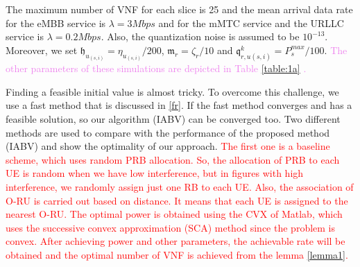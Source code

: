 \documentclass[lettersize,journal]{IEEEtran}
\begin{document}
The maximum number of VNF for each slice is 25 and the mean arrival data rate for the eMBB service is $\lambda  = 3Mbps$ and for the mMTC service and the URLLC  service is $\lambda  = 0.2Mbps$. 
Also, the quantization noise is assumed to be $10^{-13}$.
Moreover, we set $\mathfrak{h}_{u_{(s,i)}} = \eta_{u_{(s,i)}}/200$, $\mathfrak{m}_{r} = \zeta_r/10$
and $\mathfrak{q}^k_{r,u(s,i)} = P_{s}^{max}/100$. \textcolor{Violet}{The other parameters of these simulations are depicted in Table \ref{table:1a} \cite{3GPPTS1, 3GPPTS2, 3GPPTS3, IMT, ETSI1}.}
\begin{table}[H]
 \caption {Simulation Parameters} \label{table:1a}
 \begin{center}
 \end{center}
 \end{table} 
Finding a feasible initial value is almost tricky. To overcome this challenge, we use a fast method that is discussed in \ref{fr}. If the fast method converges and has a feasible solution, so our algorithm (IABV) can be converged too.
Two different methods are used to compare with the performance of the proposed method (IABV) and show the optimality of our approach.
\textcolor{red}{ The first one is a baseline scheme, which uses random PRB allocation. 
So, the allocation of PRB  to each UE is random when we have low interference, but in figures with high interference, we randomly assign just one RB to each UE. Also, the association of O-RU is carried out based on distance. It means that each UE is assigned to the nearest O-RU. The optimal power is obtained using the CVX of Matlab, which uses the successive convex approximation (SCA) method since the problem is convex. After achieving power and other parameters, the achievable rate will be obtained and the optimal number of VNF is achieved from the lemma \eqref{lemma1}.}
\end{document}
